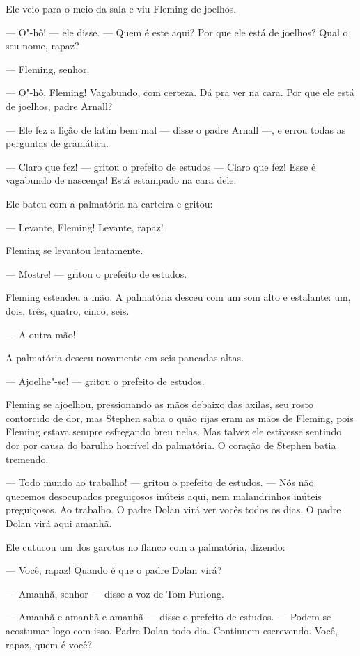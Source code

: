 Ele veio para o meio da sala e viu Fleming de joelhos.

 --- O"-hô! --- ele disse. --- Quem é este aqui? Por que ele está de joelhos? Qual o
seu nome, rapaz?

 --- Fleming, senhor.

 --- O"-hô, Fleming! Vagabundo, com certeza. Dá pra ver na cara. Por que ele
está de joelhos, padre Arnall?

 --- Ele fez a lição de latim bem mal --- disse o padre Arnall ---, e errou todas
as perguntas de gramática.

 --- Claro que fez! --- gritou o prefeito de estudos --- Claro que fez! Esse é
 vagabundo de nascença! Está estampado na cara dele.

Ele bateu com a palmatória na carteira e gritou:

 --- Levante, Fleming! Levante, rapaz!

Fleming se levantou lentamente.

 --- Mostre! --- gritou o prefeito de estudos.

Fleming estendeu a mão. A palmatória desceu com um som alto e estalante:
um, dois, três, quatro, cinco, seis.

 --- A outra mão!

A palmatória desceu novamente em seis pancadas altas.

 --- Ajoelhe"-se! --- gritou o prefeito de estudos.

Fleming se ajoelhou, pressionando as mãos debaixo das axilas, seu rosto
contorcido de dor, mas Stephen sabia o quão rijas eram as mãos de
Fleming, pois Fleming estava sempre esfregando breu nelas. Mas talvez
ele estivesse sentindo dor por causa do barulho horrível da palmatória.
O coração de Stephen batia tremendo.

 --- Todo mundo ao trabalho! --- gritou o prefeito de estudos. --- Nós não queremos
desocupados preguiçosos inúteis aqui, nem malandrinhos inúteis
preguiçosos. Ao trabalho. O padre Dolan virá ver vocês todos os
dias. O padre Dolan virá aqui amanhã.

Ele cutucou um dos garotos no flanco com a palmatória, dizendo: 
                                                                  
 --- Você, rapaz! Quando é que o padre Dolan virá?

 --- Amanhã, senhor --- disse a voz de Tom Furlong.

 --- Amanhã e amanhã e amanhã --- disse o prefeito de estudos. --- Podem se
acostumar logo com isso. Padre Dolan todo dia. Continuem escrevendo.
Você, rapaz, quem é você?


